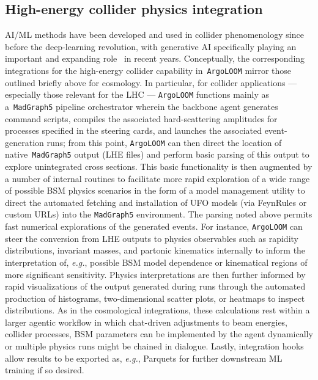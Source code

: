 \documentclass[final,3p,times,sort,compress]{elsarticle}
\newcommand{\AL}{\texttt{ArgoLOOM}\xspace}
\newcommand{\MG}{\texttt{MadGraph5}\xspace}
\begin{document}
\subsection{High-energy collider physics integration}
\label{sec:collider}
%
%
AI/ML methods have been developed and used in collider phenomenology since before the deep-learning revolution,
with generative AI specifically playing an important and expanding role~\cite{Almaeen:2024guo, Kriesten:2024ist,Kriesten:2024are,Kriesten:2023uoi,Kriesten:2025gti} in recent years.
%
%
Conceptually, the corresponding integrations for the high-energy collider capability in~\AL mirror those outlined briefly
above for cosmology.
%
In particular, for collider applications --- especially those relevant for the LHC --- \AL functions mainly as a~\MG pipeline orchestrator
wherein the backbone agent generates command scripts, compiles the associated hard-scattering amplitudes for processes specified
in the steering cards, and launches the associated event-generation runs;
%
from this point, \AL can then direct the location of native~\MG output (LHE files) and perform basic
parsing of this output to explore unintegrated cross sections.
%
This basic functionality is then augmented by a number of internal routines to facilitate more rapid exploration
of a wide range of possible BSM physics scenarios in the form of a model management utility to direct the
automated fetching and installation of UFO models (via FeynRules \cite{Alloul:2013bka} or custom URLs) into the \MG environment.
%
%
The parsing noted above permits fast numerical explorations of the generated events. For instance, \AL can steer the
conversion from LHE outputs to physics observables such as rapidity distributions, invariant masses, and partonic
kinematics internally to inform the interpretation of, {\it e.g.}, possible BSM model dependence or kinematical
regions of more significant sensitivity.
%
Physics interpretations are then further informed by rapid visualizations of the output generated during runs through
the automated production of histograms, two-dimensional scatter plots, or heatmaps to inspect distributions.
%
As in the cosmological integrations, these calculations rest within a larger agentic workflow in which chat-driven
adjustments to beam energies, collider processes, BSM parameters can be implemented by the agent
dynamically or multiple physics runs might be chained in dialogue.
%
Lastly, integration hooks allow results to be exported as, {\it e.g.}, Parquets for further downstream ML training
if so desired.
\end{document}
